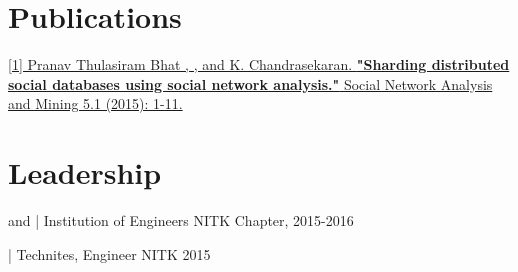 \documentclass[]{deedy-resume-openfont}
\begin{document}
\begin{minipage}[t]{0.49\textwidth}
\section{Publications}
\href{http://link.springer.com/article/10.1007/s13278-015-0274-0}{[1] Pranav Thulasiram Bhat , , and K. Chandrasekaran. \textbf{"Sharding distributed social databases using social network analysis."} Social Network Analysis and Mining 5.1 (2015): 1-11.}
\section{Leadership}
\sectionsep
\begin{tightemize}
\item {} and  | Institution of Engineers NITK Chapter, 2015-2016
\item {} | Technites, Engineer NITK 2015
\end{tightemize}
\end{minipage} 
\end{document}
